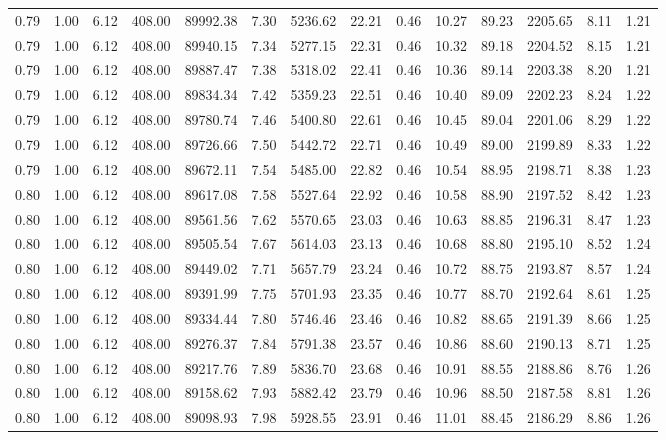 \begin{table}[!ht]
\begin{tabular}{rrrrrrrrrrrrrr}
0.79 & 1.00 & 6.12 & 408.00 & 89992.38 & 7.30 & 5236.62 & 22.21 & 0.46 & 10.27 & 89.23 & 2205.65 & 8.11 & 1.21 \\
0.79 & 1.00 & 6.12 & 408.00 & 89940.15 & 7.34 & 5277.15 & 22.31 & 0.46 & 10.32 & 89.18 & 2204.52 & 8.15 & 1.21 \\
0.79 & 1.00 & 6.12 & 408.00 & 89887.47 & 7.38 & 5318.02 & 22.41 & 0.46 & 10.36 & 89.14 & 2203.38 & 8.20 & 1.21 \\
0.79 & 1.00 & 6.12 & 408.00 & 89834.34 & 7.42 & 5359.23 & 22.51 & 0.46 & 10.40 & 89.09 & 2202.23 & 8.24 & 1.22 \\
0.79 & 1.00 & 6.12 & 408.00 & 89780.74 & 7.46 & 5400.80 & 22.61 & 0.46 & 10.45 & 89.04 & 2201.06 & 8.29 & 1.22 \\
0.79 & 1.00 & 6.12 & 408.00 & 89726.66 & 7.50 & 5442.72 & 22.71 & 0.46 & 10.49 & 89.00 & 2199.89 & 8.33 & 1.22 \\
0.79 & 1.00 & 6.12 & 408.00 & 89672.11 & 7.54 & 5485.00 & 22.82 & 0.46 & 10.54 & 88.95 & 2198.71 & 8.38 & 1.23 \\
0.80 & 1.00 & 6.12 & 408.00 & 89617.08 & 7.58 & 5527.64 & 22.92 & 0.46 & 10.58 & 88.90 & 2197.52 & 8.42 & 1.23 \\
0.80 & 1.00 & 6.12 & 408.00 & 89561.56 & 7.62 & 5570.65 & 23.03 & 0.46 & 10.63 & 88.85 & 2196.31 & 8.47 & 1.23 \\
0.80 & 1.00 & 6.12 & 408.00 & 89505.54 & 7.67 & 5614.03 & 23.13 & 0.46 & 10.68 & 88.80 & 2195.10 & 8.52 & 1.24 \\
0.80 & 1.00 & 6.12 & 408.00 & 89449.02 & 7.71 & 5657.79 & 23.24 & 0.46 & 10.72 & 88.75 & 2193.87 & 8.57 & 1.24 \\
0.80 & 1.00 & 6.12 & 408.00 & 89391.99 & 7.75 & 5701.93 & 23.35 & 0.46 & 10.77 & 88.70 & 2192.64 & 8.61 & 1.25 \\
0.80 & 1.00 & 6.12 & 408.00 & 89334.44 & 7.80 & 5746.46 & 23.46 & 0.46 & 10.82 & 88.65 & 2191.39 & 8.66 & 1.25 \\
0.80 & 1.00 & 6.12 & 408.00 & 89276.37 & 7.84 & 5791.38 & 23.57 & 0.46 & 10.86 & 88.60 & 2190.13 & 8.71 & 1.25 \\
0.80 & 1.00 & 6.12 & 408.00 & 89217.76 & 7.89 & 5836.70 & 23.68 & 0.46 & 10.91 & 88.55 & 2188.86 & 8.76 & 1.26 \\
0.80 & 1.00 & 6.12 & 408.00 & 89158.62 & 7.93 & 5882.42 & 23.79 & 0.46 & 10.96 & 88.50 & 2187.58 & 8.81 & 1.26 \\
0.80 & 1.00 & 6.12 & 408.00 & 89098.93 & 7.98 & 5928.55 & 23.91 & 0.46 & 11.01 & 88.45 & 2186.29 & 8.86 & 1.26 \\

\end{tabular}
\end{table}
